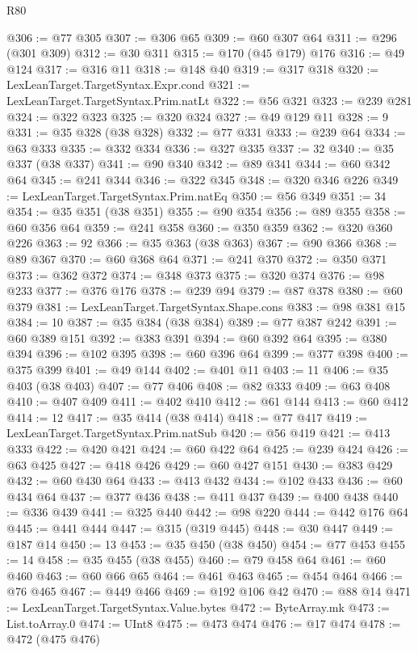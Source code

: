 \begin{lexlean}{R80}
\begin{coremodule}
@306 := @77 @305
@307 := @306 @65
@309 := @60 @307 @64
@311 := @296 (@301 @309)
@312 := @30 @311
@315 := @170 (@45 @179) @176
@316 := @49 @124
@317 := @316 @11
@318 := @148 @40
@319 := @317 @318
@320 := LexLeanTarget.TargetSyntax.Expr.cond
@321 := LexLeanTarget.TargetSyntax.Prim.natLt
@322 := @56 @321
@323 := @239 @281
@324 := @322 @323
@325 := @320 @324
@327 := @49 @129 @11
@328 := 9
@331 := @35 @328 (@38 @328)
@332 := @77 @331
@333 := @239 @64
@334 := @63 @333
@335 := @332 @334
@336 := @327 @335
@337 := 32
@340 := @35 @337 (@38 @337)
@341 := @90 @340
@342 := @89 @341
@344 := @60 @342 @64
@345 := @241 @344
@346 := @322 @345
@348 := @320 @346 @226
@349 := LexLeanTarget.TargetSyntax.Prim.natEq
@350 := @56 @349
@351 := 34
@354 := @35 @351 (@38 @351)
@355 := @90 @354
@356 := @89 @355
@358 := @60 @356 @64
@359 := @241 @358
@360 := @350 @359
@362 := @320 @360 @226
@363 := 92
@366 := @35 @363 (@38 @363)
@367 := @90 @366
@368 := @89 @367
@370 := @60 @368 @64
@371 := @241 @370
@372 := @350 @371
@373 := @362 @372
@374 := @348 @373
@375 := @320 @374
@376 := @98 @233
@377 := @376 @176
@378 := @239 @94
@379 := @87 @378
@380 := @60 @379
@381 := LexLeanTarget.TargetSyntax.Shape.cons
@383 := @98 @381 @15
@384 := 10
@387 := @35 @384 (@38 @384)
@389 := @77 @387 @242
@391 := @60 @389 @151
@392 := @383 @391
@394 := @60 @392 @64
@395 := @380 @394
@396 := @102 @395
@398 := @60 @396 @64
@399 := @377 @398
@400 := @375 @399
@401 := @49 @144
@402 := @401 @11
@403 := 11
@406 := @35 @403 (@38 @403)
@407 := @77 @406
@408 := @82 @333
@409 := @63 @408
@410 := @407 @409
@411 := @402 @410
@412 := @61 @144
@413 := @60 @412
@414 := 12
@417 := @35 @414 (@38 @414)
@418 := @77 @417
@419 := LexLeanTarget.TargetSyntax.Prim.natSub
@420 := @56 @419
@421 := @413 @333
@422 := @420 @421
@424 := @60 @422 @64
@425 := @239 @424
@426 := @63 @425
@427 := @418 @426
@429 := @60 @427 @151
@430 := @383 @429
@432 := @60 @430 @64
@433 := @413 @432
@434 := @102 @433
@436 := @60 @434 @64
@437 := @377 @436
@438 := @411 @437
@439 := @400 @438
@440 := @336 @439
@441 := @325 @440
@442 := @98 @220
@444 := @442 @176 @64
@445 := @441 @444
@447 := @315 (@319 @445)
@448 := @30 @447
@449 := @187 @14
@450 := 13
@453 := @35 @450 (@38 @450)
@454 := @77 @453
@455 := 14
@458 := @35 @455 (@38 @455)
@460 := @79 @458 @64
@461 := @60 @460
@463 := @60 @66 @65
@464 := @461 @463
@465 := @454 @464
@466 := @76 @465
@467 := @449 @466
@469 := @192 @106 @42
@470 := @88 @14
@471 := LexLeanTarget.TargetSyntax.Value.bytes
@472 := ByteArray.mk
@473 := List.toArray.{0}
@474 := UInt8
@475 := @473 @474
@476 := @17 @474
@478 := @472 (@475 @476)

\end{coremodule}
\end{lexlean}
